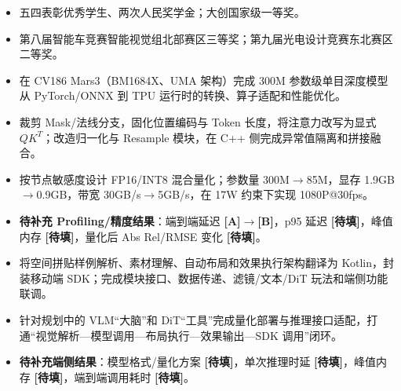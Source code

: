 
\begin{itemize}
  \item 五四表彰优秀学生、两次人民奖学金；大创国家级一等奖。
  \item 第八届智能车竞赛智能视觉组北部赛区三等奖；第九届光电设计竞赛东北赛区二等奖。
\end{itemize}

\begin{itemize}
  \item 在 CV186 Mars3（BM1684X、UMA 架构）完成 300M 参数级单目深度模型从 PyTorch/ONNX 到 TPU 运行时的转换、算子适配和性能优化。
  \item 裁剪 Mask/法线分支，固化位置编码与 Token 长度，将注意力改写为显式 $QK^T$；改造归一化与 Resample 模块，在 C++ 侧完成异常值隔离和拼接融合。
  \item 按节点敏感度设计 FP16/INT8 混合量化；参数量 300M$\rightarrow$85M，显存 1.9GB$\rightarrow$0.9GB，带宽 30GB/s$\rightarrow$5GB/s，在 17W 约束下实现 1080P@30fps。
  \item \textbf{待补充 Profiling/精度结果}：端到端延迟 \textbf{[A]}$\rightarrow$\textbf{[B]}，p95 延迟 \textbf{[待填]}，峰值内存 \textbf{[待填]}，量化后 Abs Rel/RMSE 变化 \textbf{[待填]}。
\end{itemize}

\begin{itemize}
  \item 将空间拼贴样例解析、素材理解、自动布局和效果执行架构翻译为 Kotlin，封装移动端 SDK；完成模块接口、数据传递、滤镜/文本/DiT 玩法和端侧功能联调。
  \item 针对规划中的 VLM“大脑”和 DiT“工具”完成量化部署与推理接口适配，打通“视觉解析—模型调用—布局执行—效果输出—SDK 调用”闭环。
  \item \textbf{待补充端侧结果}：模型格式/量化方案 \textbf{[待填]}，单次推理时延 \textbf{[待填]}，峰值内存 \textbf{[待填]}，端到端调用耗时 \textbf{[待填]}。
\end{itemize}


